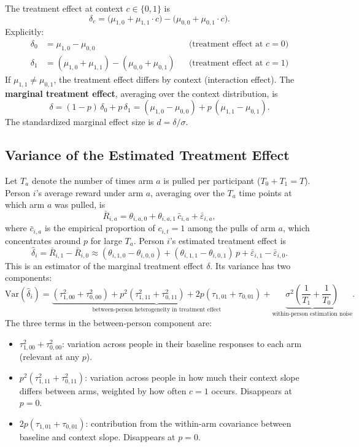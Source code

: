 \documentclass{article}
\begin{document}
The treatment effect at context $c \in \{0, 1\}$ is
\[
    \delta_c = \bigl(\mu_{1,0} + \mu_{1,1}\cdot c\bigr) - \bigl(\mu_{0,0} + \mu_{0,1}\cdot c\bigr).
\]
Explicitly:
\begin{align*}
    \delta_0 &= \mu_{1,0} - \mu_{0,0} &&\text{(treatment effect at } c = 0\text{)}\\
    \delta_1 &= (\mu_{1,0} + \mu_{1,1}) - (\mu_{0,0} + \mu_{0,1}) &&\text{(treatment effect at } c = 1\text{)}
\end{align*}
If $\mu_{1,1} \neq \mu_{0,1}$, the treatment effect differs by context (interaction effect).
The \textbf{marginal treatment effect}, averaging over the context distribution, is
\[
    \delta = (1 - p)\,\delta_0 + p\,\delta_1
    = (\mu_{1,0} - \mu_{0,0}) + p\,(\mu_{1,1} - \mu_{0,1}).
\]
The standardized marginal effect size is $d = \delta / \sigma$.

\subsection{Variance of the Estimated Treatment Effect}

Let $T_a$ denote the number of times arm $a$ is pulled per participant ($T_0 + T_1 = T$).
Person $i$'s average reward under arm $a$, averaging over the $T_a$ time points at which arm $a$
was pulled, is
\[
    \bar{R}_{i,a} = \theta_{i,a,0} + \theta_{i,a,1}\,\bar{c}_{i,a} + \bar{\varepsilon}_{i,a},
\]
where $\bar{c}_{i,a}$ is the empirical proportion of $c_{i,t} = 1$ among the pulls of arm $a$,
which concentrates around $p$ for large $T_a$.
Person $i$'s estimated treatment effect is
\[
    \hat{\delta}_i = \bar{R}_{i,1} - \bar{R}_{i,0}
    \approx (\theta_{i,1,0} - \theta_{i,0,0}) + (\theta_{i,1,1} - \theta_{i,0,1})\,p
    + \bar{\varepsilon}_{i,1} - \bar{\varepsilon}_{i,0}.
\]
This is an estimator of the marginal treatment effect $\delta$.
Its variance has two components:
\[
    \mathrm{Var}(\hat{\delta}_i)
    = \underbrace{
        (\tau^2_{1,00} + \tau^2_{0,00})
        + p^2(\tau^2_{1,11} + \tau^2_{0,11})
        + 2p(\tau_{1,01} + \tau_{0,01})
      }_{\text{between-person heterogeneity in treatment effect}}
    + \underbrace{
        \sigma^2\!\left(\frac{1}{T_1} + \frac{1}{T_0}\right)
      }_{\text{within-person estimation noise}}.
\]
The three terms in the between-person component are:
\begin{itemize}
    \item $\tau^2_{1,00} + \tau^2_{0,00}$: variation across people in their baseline responses to each arm (relevant at any $p$).
    \item $p^2(\tau^2_{1,11} + \tau^2_{0,11})$: variation across people in how much their context slope differs between arms, weighted by how often $c=1$ occurs. Disappears at $p=0$.
    \item $2p(\tau_{1,01} + \tau_{0,01})$: contribution from the within-arm covariance between baseline and context slope. Disappears at $p=0$.
\end{itemize}
\end{document}
